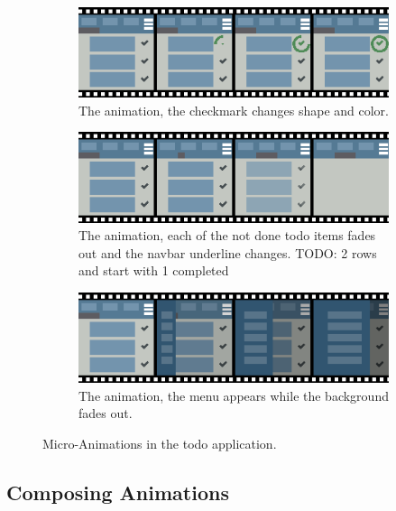 \begin{figure}[h]
\centering

\begin{subfigure}[h]{\textwidth}
\centering
\includegraphics[width=\figscale\textwidth]{pictures/completeIconCheckFig}
\caption{The  animation, the checkmark changes shape and color.}
\label{fig:completeIconCheck}
\end{subfigure}

\begin{subfigure}[h]{\textwidth}
\centering
\includegraphics[width=\figscale\textwidth]{pictures/onlyDoneFig}
\caption{The  animation, each of the not done todo items fades out and the navbar underline changes. TODO: 2 rows and start with 1 completed}
\label{fig:onlyDoneFig}
\end{subfigure}

\begin{subfigure}[h]{\textwidth}
\centering
\includegraphics[width=\figscale\textwidth]{pictures/menuIntroFig}
\caption{The  animation, the menu appears while the background fades out.}
\label{fig:menuIntroFig}
\end{subfigure}

\caption{Micro-Animations in the todo application.}
\label{fig:animExamples}
\end{figure}

\subsection{Composing Animations}

